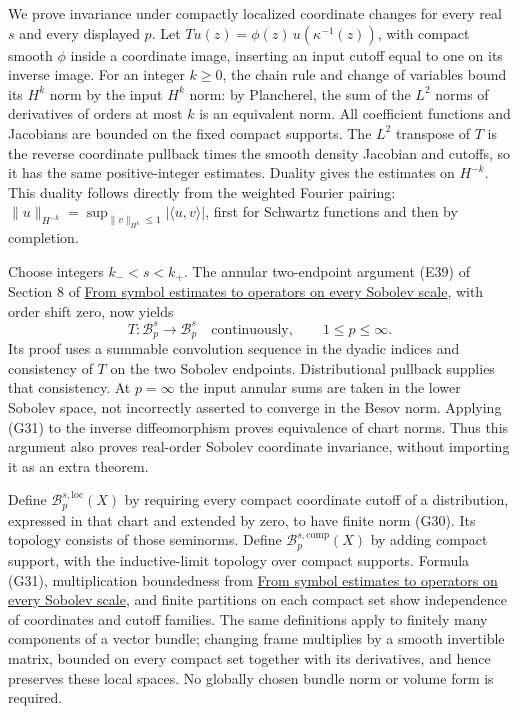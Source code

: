 \documentclass[
  11pt,
]{article}
\begin{document}
We prove invariance under compactly localized coordinate changes for
every real \(s\) and every displayed \(p\). Let
\(Tu(z)=\phi(z)\,u(\kappa^{-1}(z))\), with compact smooth \(\phi\)
inside a coordinate image, inserting an input cutoff equal to one on its
inverse image. For an integer \(k\geq0\), the chain rule and change of
variables bound its \(H^k\) norm by the input \(H^k\) norm: by
Plancherel, the sum of the \(L^2\) norms of derivatives of orders at
most \(k\) is an equivalent norm. All coefficient functions and
Jacobians are bounded on the fixed compact supports. The \(L^2\)
transpose of \(T\) is the reverse coordinate pullback times the smooth
density Jacobian and cutoffs, so it has the same positive-integer
estimates. Duality gives the estimates on \(H^{-k}\). This duality
follows directly from the weighted Fourier pairing:
\(\|u\|_{H^{-k}}=\sup_{\|v\|_{H^k}\leq1}|\langle u,v\rangle|\), first
for Schwartz functions and then by completion.

Choose integers \(k_-<s<k_+\). The annular two-endpoint argument (E39)
of Section 8 of \href{euclidean-symbol-calculus.pdf}{From symbol
estimates to operators on every Sobolev scale}, with order shift zero,
now yields \[
T:\mathcal B^s_p\longrightarrow\mathcal B^s_p
\quad\text{continuously},\qquad1\leq p\leq\infty.
\tag{G31}
\] Its proof uses a summable convolution sequence in the dyadic indices
and consistency of \(T\) on the two Sobolev endpoints. Distributional
pullback supplies that consistency. At \(p=\infty\) the input annular
sums are taken in the lower Sobolev space, not incorrectly asserted to
converge in the Besov norm. Applying (G31) to the inverse diffeomorphism
proves equivalence of chart norms. Thus this argument also proves
real-order Sobolev coordinate invariance, without importing it as an
extra theorem.

Define \(\mathcal B^{s,\mathrm{loc}}_p(X)\) by requiring every compact
coordinate cutoff of a distribution, expressed in that chart and
extended by zero, to have finite norm (G30). Its topology consists of
those seminorms. Define \(\mathcal B^{s,\mathrm{comp}}_p(X)\) by adding
compact support, with the inductive-limit topology over compact
supports. Formula (G31), multiplication boundedness from
\href{euclidean-symbol-calculus.pdf}{From symbol estimates to operators
on every Sobolev scale}, and finite partitions on each compact set show
independence of coordinates and cutoff families. The same definitions
apply to finitely many components of a vector bundle; changing frame
multiplies by a smooth invertible matrix, bounded on every compact set
together with its derivatives, and hence preserves these local spaces.
No globally chosen bundle norm or volume form is required.
\end{document}
